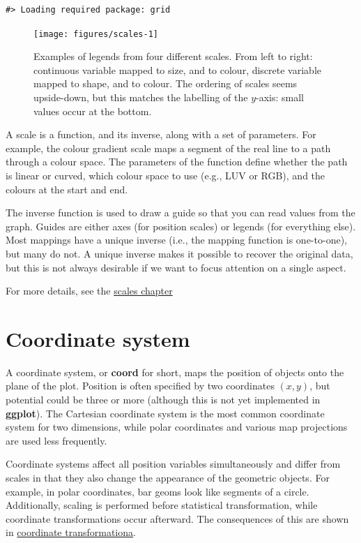 \begin{verbatim}
#> Loading required package: grid
\end{verbatim}

\begin{figure}

{\centering \texttt{[image: figures/scales-1]} 

}

\caption{Examples of legends from four different scales. From left to right: continuous variable mapped to size, and to colour, discrete variable mapped to shape, and to colour. The ordering of scales seems upside-down, but this matches the labelling of the $y$-axis: small values occur at the bottom.\label{fig:scales}}
\end{figure}

A scale is a function, and its inverse, along with a set of parameters.
For example, the colour gradient scale maps a segment of the real line
to a path through a colour space. The parameters of the function define
whether the path is linear or curved, which colour space to use (e.g.,
LUV or RGB), and the colours at the start and end.

The inverse function is used to draw a guide so that you can read values
from the graph. Guides are either axes (for position scales) or legends
(for everything else). Most mappings have a unique inverse (i.e., the
mapping function is one-to-one), but many do not. A unique inverse makes
it possible to recover the original data, but this is not always
desirable if we want to focus attention on a single aspect.

For more details, see the \hyperref[cha:scales]{scales chapter}

\section{Coordinate system}\label{sec:coordinate-systems}

A coordinate system, or \textbf{coord} for short, maps the position of
objects onto the plane of the plot. Position is often specified by two
coordinates \((x, y)\), but potential could be three or more (although
this is not yet implemented in \textbf{ggplot}). The Cartesian
coordinate system is the most common coordinate system for two
dimensions, while polar coordinates and various map projections are used
less frequently. 

Coordinate systems affect all position variables simultaneously and
differ from scales in that they also change the appearance of the
geometric objects. For example, in polar coordinates, bar geoms look
like segments of a circle. Additionally, scaling is performed before
statistical transformation, while coordinate transformations occur
afterward. The consequences of this are shown in
\hyperref[sub:coord-transformation]{coordinate transformationa}.

